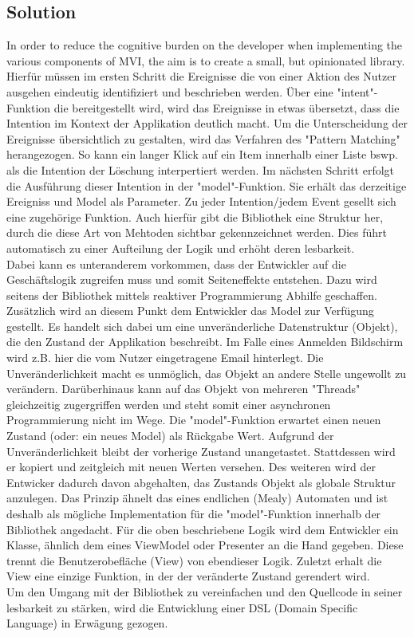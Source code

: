\subsection{Solution}
\label{subsec:solution}


In order to reduce the cognitive burden on the developer when implementing the various components of MVI, the aim 
is to create a small, but opinionated library.
Hierfür müssen im ersten Schritt die Ereignisse die von einer Aktion des Nutzer ausgehen eindeutig identifiziert und beschrieben werden.
Über eine "intent"-Funktion die bereitgestellt wird, wird das Ereignisse in etwas übersetzt, dass die Intention im Kontext der Applikation
deutlich macht. Um die Unterscheidung der Ereignisse übersichtlich zu gestalten, wird das Verfahren des "Pattern Matching" herangezogen.
So kann ein langer Klick auf ein Item innerhalb einer Liste bswp. als die Intention der Löschung interpertiert werden.
Im nächsten Schritt erfolgt die Ausführung dieser Intention in der "model"-Funktion. Sie erhält das derzeitige Ereigniss und Model als Parameter.
Zu jeder Intention/jedem Event gesellt sich eine zugehörige Funktion. Auch hierfür gibt die Bibliothek eine Struktur her, durch die diese Art von Mehtoden 
sichtbar gekennzeichnet werden. Dies führt automatisch zu einer Aufteilung der Logik und erhöht deren lesbarkeit. \\
Dabei kann es unteranderem vorkommen, dass der Entwickler auf die Geschäftslogik zugreifen muss und somit Seiteneffekte entstehen. Dazu wird seitens der 
Bibliothek mittels reaktiver Programmierung Abhilfe geschaffen. Zusätzlich wird an diesem Punkt dem Entwickler das Model zur Verfügung gestellt.
Es handelt sich dabei um eine unveränderliche Datenstruktur (Objekt), die den Zustand der Applikation beschreibt. Im Falle eines Anmelden Bildschirm wird z.B. 
hier die vom Nutzer eingetragene Email hinterlegt. Die Unveränderlichkeit macht es unmöglich, das Objekt an andere Stelle ungewollt zu verändern. 
Darüberhinaus kann auf das Objekt von mehreren "Threads" gleichzeitig zugergriffen werden und steht somit einer asynchronen Programmierung nicht im Wege.
Die "model"-Funktion erwartet einen neuen Zustand (oder: ein neues Model) als Rückgabe Wert. Aufgrund der Unveränderlichkeit bleibt der vorherige Zustand
unangetastet. Stattdessen wird er kopiert und zeitgleich mit neuen Werten versehen. Des weiteren wird der Entwicker dadurch davon abgehalten, das Zustands Objekt 
als globale Struktur anzulegen. Das Prinzip ähnelt das eines endlichen (Mealy) Automaten und ist deshalb als mögliche Implementation für die "model"-Funktion 
innerhalb der Bibliothek angedacht.
Für die oben beschriebene Logik wird dem Entwickler ein Klasse, ähnlich dem eines ViewModel oder Presenter an die Hand gegeben. Diese trennt die Benutzerobefläche (View)
von ebendieser Logik.
Zuletzt erhalt die View eine einzige Funktion, in der der veränderte Zustand gerendert wird.
\\
Um den Umgang mit der Bibliothek zu vereinfachen und den Quellcode in seiner lesbarkeit zu stärken,
wird die Entwicklung einer DSL (Domain Specific Language) in Erwägung gezogen.


